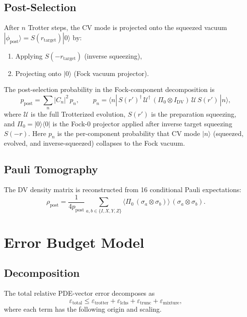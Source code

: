 \documentclass[11pt]{article}
\newcommand{\ket}[1]{|{#1}\rangle}
\newcommand{\bra}[1]{\langle{#1}|}
\newcommand{\eps}{\varepsilon}
\begin{document}
\subsection{Post-Selection}
After $n$ Trotter steps, the CV mode is projected onto the squeezed vacuum
$\ket{\phi_{\mathrm{post}}} = S(r_{\mathrm{target}})\ket{0}$ by:
\begin{enumerate}
\item Applying $S(-r_{\mathrm{target}})$ (inverse squeezing),
\item Projecting onto $\ket{0}$ (Fock vacuum projector).
\end{enumerate}
The post-selection probability in the Fock-component decomposition is
\begin{equation}
p_{\mathrm{post}} = \sum_n |C_n|^2\,p_n,
\qquad
p_n = \bra{n}\,S(r')^\dagger\,\mathcal{U}^\dagger\,
  (\Pi_0 \otimes I_{\mathrm{DV}})\,
  \mathcal{U}\,S(r')\,\ket{n},
\end{equation}
where $\mathcal{U}$ is the full Trotterized evolution, $S(r')$ is the
preparation squeezing, and $\Pi_0 = \ket{0}\!\bra{0}$ is the Fock-0 projector
applied after inverse target squeezing $S(-r)$.  Here $p_n$ is the per-component
probability that CV mode $\ket{n}$ (squeezed, evolved, and inverse-squeezed)
collapses to the Fock vacuum.

\subsection{Pauli Tomography}
The DV density matrix is reconstructed from 16 conditional Pauli expectations:
\begin{equation}
\rho_{\mathrm{post}} = \frac{1}{4p_{\mathrm{post}}}
\sum_{a,b\in\{I,X,Y,Z\}} \langle \Pi_0\,(\sigma_a\otimes\sigma_b)\rangle\,
(\sigma_a\otimes\sigma_b).
\end{equation}

\section{Error Budget Model}\label{sec:error-budget}

\subsection{Decomposition}
The total relative PDE-vector error decomposes as
\begin{equation}\label{eq:error-budget}
\eps_{\mathrm{total}} \leq \eps_{\mathrm{trotter}} + \eps_{\mathrm{lchs}}
  + \eps_{\mathrm{trunc}} + \eps_{\mathrm{mixture}},
\end{equation}
where each term has the following origin and scaling.
\end{document}
